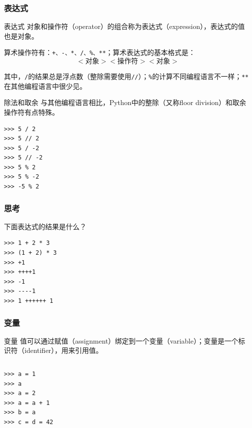 \documentclass[aspectratio=169, 14pt]{beamer}
\begin{document}
\begin{frame}
	\frametitle{表达式}
	\begin{exampleblock}{表达式}
		对象和操作符（operator）的组合称为\alert{表达式}（expression），表达式的值也是对象。
	\end{exampleblock}
	算术操作符有：\texttt{+、-、*、/、\%、**}；算术表达式的基本格式是：
	$$<\mbox{对象}> <\mbox{操作符}> <\mbox{对象}>$$

	其中，\texttt{/}的结果总是浮点数（整除需要使用\texttt{//}）；\texttt{\%}的计算不同编程语言不一样；\texttt{**}在其他编程语言中很少见。
\end{frame}

\begin{frame}[fragile]{除法和取余}
	与其他编程语言相比，Python中的整除（又称floor division）和取余操作符有点特殊。
	\begin{verbatim}
>>> 5 / 2
>>> 5 // 2
>>> 5 / -2
>>> 5 // -2
>>> 5 % 2
>>> 5 % -2
>>> -5 % 2
\end{verbatim}
\end{frame}

\begin{frame}[fragile]
	\frametitle{思考}
	下面表达式的结果是什么？
	\begin{verbatim}
>>> 1 + 2 * 3
>>> (1 + 2) * 3
>>> +1
>>> ++++1
>>> -1
>>> ----1
>>> 1 ++++++ 1
\end{verbatim}
\end{frame}

\begin{frame}[fragile]
	\frametitle{变量}
	\begin{exampleblock}{变量}
		值可以通过赋值（assignment）绑定到一个变量（variable）；变量是一个\alert{标识符}（identifier），用来引用值。
	\end{exampleblock}

	\begin{columns}
		\begin{verbatim}
>>> a = 1
>>> a
>>> a = 2
>>> a = a + 1
>>> b = a
>>> c = d = 42 
  \end{verbatim}
	\end{columns}
\end{frame}
\end{document}
